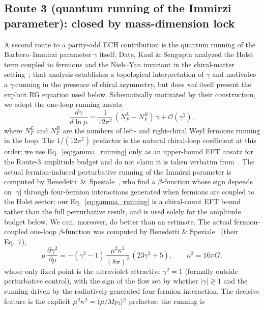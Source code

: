 \documentclass[aps,prd,twocolumn,superscriptaddress,showpacs,preprintnumbers,nofootinbib,longbibliography,floatfix]{revtex4-2}
\begin{document}
\subsection{Route 3 (quantum running of the Immirzi parameter):
closed by mass-dimension lock}
\label{sec:r3_immirzi}
A second route to a parity-odd ECH contribution is the quantum running
of the Barbero--Immirzi parameter $\gamma$ itself. Date, Kaul \& Sengupta
analyzed the Holst term coupled to fermions and the Nieh--Yan
invariant in the chiral-matter setting~\cite{DateKaulSengupta2009};
that analysis establishes a topological interpretation of $\gamma$
and motivates a $\gamma$-running in the presence of chiral asymmetry,
but does \emph{not} itself present the explicit RG equation used
below. Schematically motivated by their construction, we adopt the
one-loop running ansatz
\begin{equation}
\frac{d\gamma}{d\ln \mu}
= \frac{1}{12\pi^2}\,(N_F^L - N_F^R) \, \gamma + \mathcal{O}(\gamma^2),
\label{eq:gamma_running}
\end{equation}
where $N_F^L$ and $N_F^R$ are the numbers of left- and right-chiral
Weyl fermions running in the loop. The $1/(12\pi^2)$ prefactor is
the natural chiral-loop coefficient at this order; we use
Eq.~\eqref{eq:gamma_running} only as an upper-bound EFT ansatz
for the Route-3 amplitude budget and do not claim it is taken
verbatim from~\cite{DateKaulSengupta2009}. The actual fermion-induced
perturbative running of the Immirzi parameter is computed by
Benedetti~\&~Speziale~\cite{Benedetti2011}, who find a $\beta$-function
whose sign depends on $|\gamma|$ through four-fermion interactions
generated when fermions are coupled to the Holst sector; our
Eq.~\eqref{eq:gamma_running} is a chiral-count EFT bound rather than
the full perturbative result, and is used solely for the amplitude
budget below. We can, moreover, do better than an estimate. The actual fermion-coupled
one-loop $\beta$-function was computed by Benedetti \&
Speziale~\cite{BenedettiSpeziale2011run} (their Eq.~7),
\begin{equation}
\mu\,\frac{\partial\gamma^2}{\partial\mu}
= -(\gamma^2-1)\,\frac{\mu^2\kappa^2}{(8\pi)^2}\,(23\gamma^2+5),
\qquad \kappa^2 = 16\pi G,
\label{eq:bs_beta}
\end{equation}
whose only fixed point is the ultraviolet-attractive $\gamma^2=1$
(formally outside perturbative control), with the sign of the flow set by
whether $|\gamma|\gtrless 1$ and the running driven by the
radiatively-generated four-fermion interaction. The decisive feature is
the explicit $\mu^2\kappa^2=(\mu/M_{\rm Pl})^2$ prefactor: the running is
\end{document}
